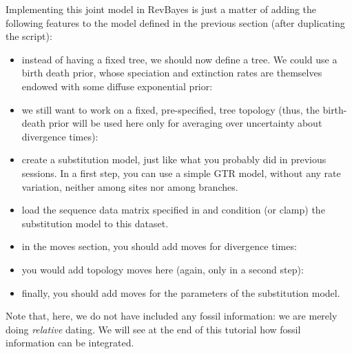 Implementing this joint model in RevBayes is just a matter of
adding the following features to the model defined in the previous section
(after duplicating the script):
\begin{itemize}
\item
instead of having a fixed tree, we should now define a  tree. We could use a birth death prior, whose speciation and extinction rates are themselves endowed with some diffuse exponential prior:
\\
\item
we still want to work on a fixed, pre-specified, tree topology (thus, the birth-death prior will be used here only for averaging over uncertainty about divergence times):
\\
\item
create a substitution model, just like what you probably did in previous sessions. In a first step, you can use a simple GTR model, without any rate variation, neither among sites nor among branches.
\item
load the sequence data matrix specified in  and condition (or clamp) the substitution model to this dataset.
\item
in the moves section, you should add moves for divergence times:
\\
\item
you would add topology moves here (again, only in a second step):
\\
\item
finally, you should add moves for the parameters of the substitution model.
\end{itemize}
Note that, here, we do not have included any fossil information: we are merely doing \emph{relative} dating. We will see at the end of this tutorial how fossil information can be integrated.

